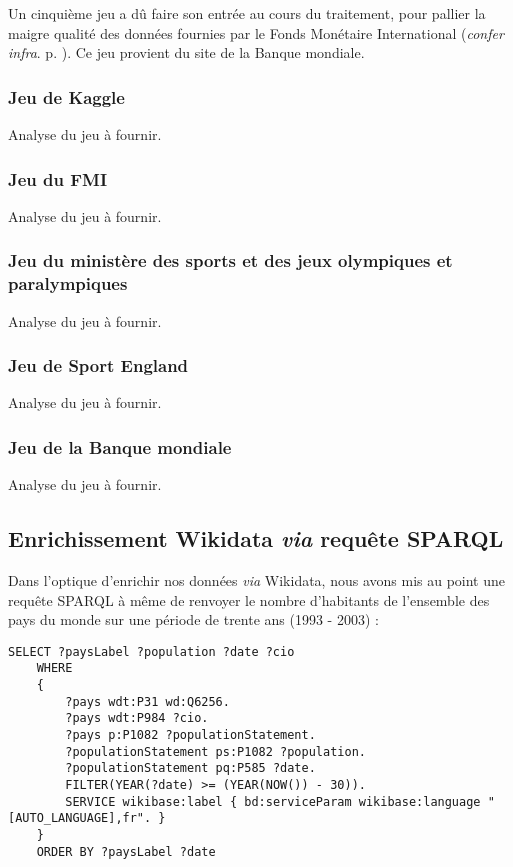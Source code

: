 \documentclass[hidelinks, 12pt]{article}
\begin{document}
Un cinquième jeu a dû faire son entrée au cours du traitement, pour pallier la maigre qualité des données fournies par le Fonds Monétaire International (\emph{confer infra}. p. \pageref{banquemondiale}). Ce jeu provient du site de la Banque mondiale\autocite{worldbank}.

\subsubsection{Jeu de Kaggle}
		
Analyse du jeu à fournir.

\subsubsection{Jeu du FMI}
		
Analyse du jeu à fournir.
		
\subsubsection{Jeu du ministère des sports et des jeux olympiques et paralympiques}
		
Analyse du jeu à fournir.
		
\subsubsection{Jeu de Sport England}

Analyse du jeu à fournir.
		
\subsubsection{Jeu de la Banque mondiale}
		
Analyse du jeu à fournir.
		
\subsection{Enrichissement Wikidata \emph{via} requête SPARQL}

Dans l'optique d'enrichir nos données \emph{via} Wikidata, nous avons mis au point une requête SPARQL à même de renvoyer le nombre d'habitants de l'ensemble des pays du monde sur une période de trente ans (1993 - 2003) :
		
\begin{lstlisting}[language=SPARQL]
	SELECT ?paysLabel ?population ?date ?cio
	WHERE 
	{
		?pays wdt:P31 wd:Q6256.
		?pays wdt:P984 ?cio.
		?pays p:P1082 ?populationStatement.
		?populationStatement ps:P1082 ?population. 
		?populationStatement pq:P585 ?date.
		FILTER(YEAR(?date) >= (YEAR(NOW()) - 30)).
		SERVICE wikibase:label { bd:serviceParam wikibase:language "[AUTO_LANGUAGE],fr". }
	}
	ORDER BY ?paysLabel ?date
\end{lstlisting}
\end{document}
